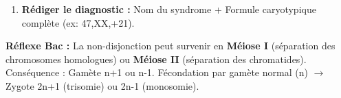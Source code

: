 \documentclass[11pt]{article}
\begin{document}
\begin{methode}
\begin{enumerate}
\begin{itemize}
                  \item \textbf{t(chr1;chr2)(bande1;bande2)} : Translocation (échange). Si robertsonienne (fusion centromères acrocentriques) $\rightarrow$ risque de trisomie 21 par translocation chez la descendance.
              \end{itemize}
        \item \textbf{Rédiger le diagnostic :} Nom du syndrome + Formule caryotypique complète (ex: 47,XX,+21).
    \end{enumerate}
    \textbf{Réflexe Bac :} La non-disjonction peut survenir en \textbf{Méiose I} (séparation des chromosomes homologues) ou \textbf{Méiose II} (séparation des chromatides). Conséquence : Gamète n+1 ou n-1. Fécondation par gamète normal (n) $\rightarrow$ Zygote 2n+1 (trisomie) ou 2n-1 (monosomie).
\end{methode}
\end{document}
